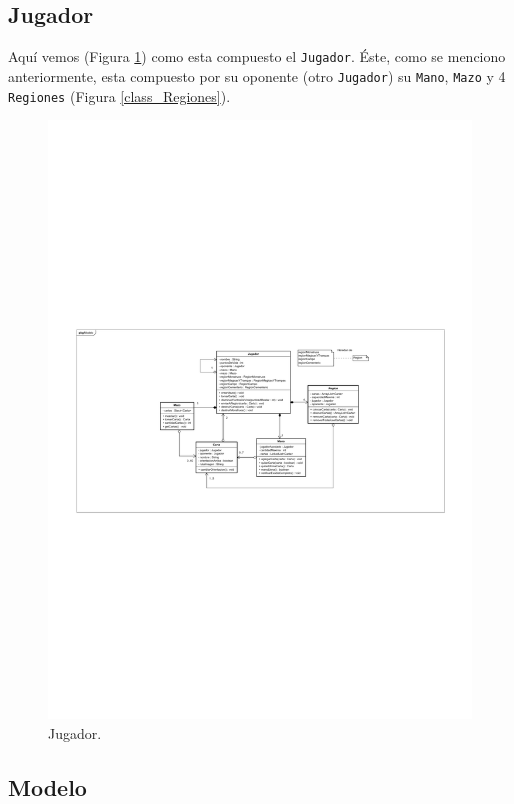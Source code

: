 	\subsection{Jugador}
	
	Aquí vemos (Figura \ref{class_Jugador}) como esta compuesto el \texttt{Jugador}. Éste, como se menciono anteriormente, esta compuesto por su oponente (otro \texttt{Jugador}) su \texttt{Mano}, \texttt{Mazo} y 4 \texttt{Regiones} (Figura \ref{class_Regiones}).
	
	\begin{figure}[H]
		\centering
		\includegraphics[scale=0.8]{includes/class_Jugador}
		\caption{Jugador.}
		\label{class_Jugador}
	\end{figure}
	
	\subsection{Modelo}
	
